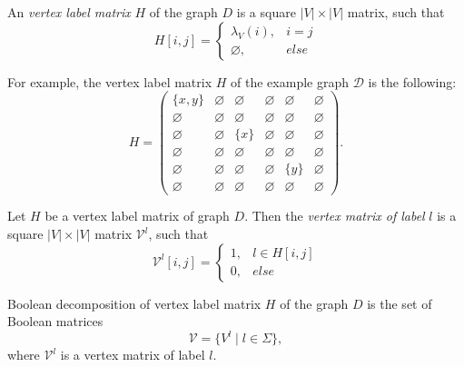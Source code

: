 \begin{definition}

An \emph{vertex label matrix} $H$ of the graph $D$ is a square $|V|\times|V|$ matrix, such that 
\begin{equation*}
H[i,j] = 
  \begin{cases}
    \lambda_V (i), & i = j \\
    \varnothing,     & else
  \end{cases}
\end{equation*}

For example, the vertex label matrix $H$ of the example graph $\mathcal{D}$ is the following:
$$
    H =
    \begin{pmatrix}
    \{x, y\}        & \varnothing     &   \varnothing      &   \varnothing   &   \varnothing   &    \varnothing  \\
    \varnothing     &   \varnothing   & \varnothing        &   \varnothing   & \varnothing     & \varnothing     \\
    \varnothing     &   \varnothing   &   \{x\}            &   \varnothing   & \varnothing     &   \varnothing   \\
    \varnothing     &   \varnothing   & \varnothing        &   \varnothing   &   \varnothing   &   \varnothing   \\
    \varnothing     &   \varnothing   &   \varnothing      &    \varnothing  &   \{y\}         & \varnothing     \\
    \varnothing     & \varnothing     &   \varnothing      &   \varnothing   & \varnothing     &   \varnothing
    \end{pmatrix}.
$$
\end{definition}

\begin{definition}
Let $H$ be a vertex label matrix of graph $D$. Then the \emph{vertex matrix of label} $l$ is a square $|V|\times|V|$ matrix $\mathcal{V}^l$, such that
\begin{equation*}
\mathcal{V}^l[i,j] = 
  \begin{cases}
    1,  & l \in H[i, j] \\
    0,  & else
  \end{cases}
\end{equation*}
\end{definition}

\begin{definition}
Boolean decomposition of vertex label matrix $H$ of the graph $D$ is the set of Boolean matrices
$$\mathcal{V} = \{V^l \mid l \in \Sigma\},$$
where $\mathcal{V}^l$ is a vertex matrix of label $l$.
\end{definition}

